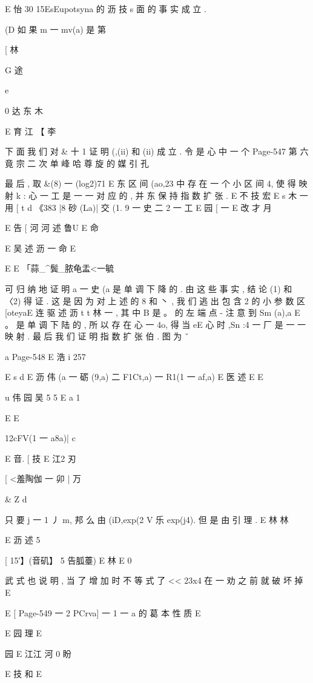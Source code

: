 {{E 怡 30 15EsEupotsyna 的 沥 技 s
面 的 事 实 成 立 .

(D 如 果 m 一 mv(a) 是 第 %

[ 林

G 途

e

0 达 东 木

E 育 江
【 李

下 面 我 们 对 & 十 1 证 明 (,(ii) 和 (ii) 成 立 . 令 是 心 中 一 个
Page-547
第 六 竟 宗 二 次 单 峰 哈 尊 旋 的 媒 引 孔

最 后 , 取 &(8) 一 (log2)71 E
东
区 间 (ao,23 中 存 在 一 个 小 区 间 4, 使 得 映 射 k : 心 一 工 是 一 一 对
应 的 , 并 东 保 持 指 数 扩 张 .
E 不 技 宏
E
s 木 一 用
[ t d
《383 |8 砂 (La)| 交 (1. 9 一 史 二 2 一 工
E 园
[ 一
E 改 才 月

E 告 [ 河 河 述 鲁U E 命

E 吴 述 沥 一 命
E

E E
「蒜_^鬓_脓龟盂<一毓

可 归 纳 地 证 明 a 一 史 (a 是 单 调 下 降 的 . 由 这 些 事 实 , 结 论 (1) 和
〈2) 得 证 . 这 是 因 为 对 上 述 的 8 和 丶 , 我 们 逃 出 包 含 2 的 小 参 数 区
[oteyaE 连 驱 述 沥 t
t 林
一 , 其 中 B 是 。 的 左 端 点 - 注 意 到 Sm (a),a E 。 是 单 调 下 陆
的 , 所 以 存 在 心 一 4o, 得 当 eE 心 时 ,Sn :4 一 厂 是 一 一 映 射 . 最
后 我 们 证 明 指 数 扩 张 伯 . 图 为 ˇ

a
Page-548
E 浩 i 257

E
s d
E 沥 伟
(a 一 砺 (9,a) 二 F1Ct,a) 一 R1(1 一 af,a)
E 医 述
E
E

u 伟
园 吴 5 5 E
a 1

E
E

12cFV(1 一 a8a)|
c

E 音. [
技
E 江2 刃

[ <羞陶伽 一 卯 | 万

& Z
d

只 要 j 一 1 丿 m, 邦 么 由 (iD,exp(2 V 乐 exp(j4). 但 是 由 引 理 .
E 林 林

E 沥 述 5

[ 15′】(音矶】 5 告胍薹) E 林 E 0

武 式 也 说 明 , 当 了 增 加 时 不 等 式 了 << 23x4 在 一 劝 之 前 就 破 坏 掉
E

E [
Page-549
一 2 PCrva] 一 1 一 a 的 葛 本 性 质 E

E 园 理
E

园
E 江江 河 0 盼

E 技
和
E

}}
